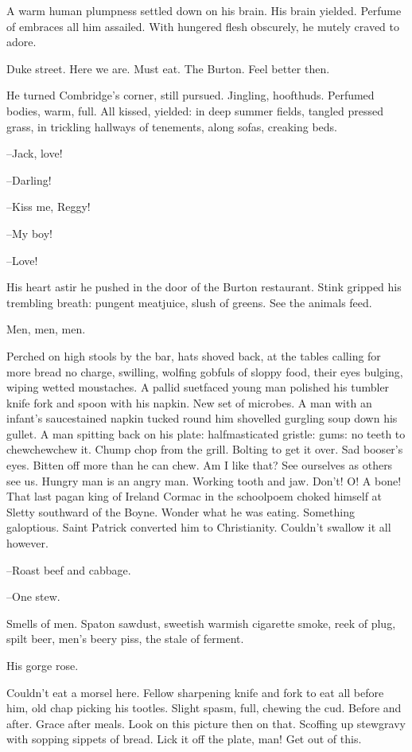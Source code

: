 A warm human plumpness settled down on his brain. His brain
yielded. Perfume of embraces all him assailed. With hungered flesh
obscurely, he mutely craved to adore.

Duke street. Here we are. Must eat. The Burton. Feel better then.

He turned Combridge's corner, still pursued. Jingling, hoofthuds.
Perfumed bodies, warm, full. All kissed, yielded: in deep summer fields,
tangled pressed grass, in trickling hallways of tenements, along sofas,
creaking beds.

--Jack, love!

--Darling!

--Kiss me, Reggy!

--My boy!

--Love!

His heart astir he pushed in the door of the Burton restaurant. Stink
gripped his trembling breath: pungent meatjuice, slush of greens. See the
animals feed.

Men, men, men.

Perched on high stools by the bar, hats shoved back, at the tables
calling for more bread no charge, swilling, wolfing gobfuls of sloppy
food, their eyes bulging, wiping wetted moustaches. A pallid suetfaced
young man polished his tumbler knife fork and spoon with his napkin. New
set of microbes. A man with an infant's saucestained napkin tucked round
him shovelled gurgling soup down his gullet. A man spitting back on his
plate: halfmasticated gristle: gums: no teeth to chewchewchew it. Chump
chop from the grill. Bolting to get it over. Sad booser's eyes. Bitten off
more than he can chew. Am I like that? See ourselves as others see us.
Hungry man is an angry man. Working tooth and jaw. Don't! O! A bone! That
last pagan king of Ireland Cormac in the schoolpoem choked himself at
Sletty southward of the Boyne. Wonder what he was eating. Something
galoptious. Saint Patrick converted him to Christianity. Couldn't swallow
it all however.

--Roast beef and cabbage.

--One stew.

Smells of men. Spaton sawdust, sweetish warmish cigarette smoke, reek of
plug, spilt beer, men's beery piss, the stale of ferment.

His gorge rose.

Couldn't eat a morsel here. Fellow sharpening knife and fork to eat
all before him, old chap picking his tootles. Slight spasm, full, chewing
the cud. Before and after. Grace after meals. Look on this picture then on
that. Scoffing up stewgravy with sopping sippets of bread. Lick it off the
plate, man! Get out of this.


